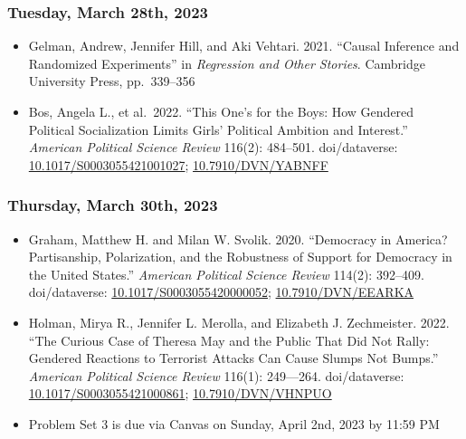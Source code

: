 \documentclass[12pt,]{article}
\begin{document}
\hypertarget{tuesday-march-28th-2023}{%
\subsubsection{Tuesday, March 28th,
2023}\label{tuesday-march-28th-2023}}

\begin{itemize}
\item
  Gelman, Andrew, Jennifer Hill, and Aki Vehtari. 2021. ``Causal
  Inference and Randomized Experiments'' in \emph{Regression and Other
  Stories}. Cambridge University Press, pp.~339--356
\item
  Bos, Angela L., et al.~2022. ``This One's for the Boys: How Gendered
  Political Socialization Limits Girls' Political Ambition and
  Interest.'' \emph{American Political Science Review} 116(2): 484--501.
  doi/dataverse:
  \href{https://doi.org/10.1017/S0003055421001027}{10.1017/S0003055421001027};
  \href{https://dataverse.harvard.edu/dataset.xhtml?persistentId=doi:10.7910/DVN/YABNFF}{10.7910/DVN/YABNFF}
\end{itemize}

\hypertarget{thursday-march-30th-2023}{%
\subsubsection{Thursday, March 30th,
2023}\label{thursday-march-30th-2023}}

\begin{itemize}
\item
  Graham, Matthew H. and Milan W. Svolik. 2020. ``Democracy in America?
  Partisanship, Polarization, and the Robustness of Support for
  Democracy in the United States.'' \emph{American Political Science
  Review} 114(2): 392--409. doi/dataverse:
  \href{https://doi.org/10.1017/S0003055420000052}{10.1017/S0003055420000052};
  \href{https://dataverse.harvard.edu/dataset.xhtml?persistentId=doi:10.7910/DVN/EEARKA}{10.7910/DVN/EEARKA}
\item
  Holman, Mirya R., Jennifer L. Merolla, and Elizabeth J. Zechmeister.
  2022. ``The Curious Case of Theresa May and the Public That Did Not
  Rally: Gendered Reactions to Terrorist Attacks Can Cause Slumps Not
  Bumps.'' \emph{American Political Science Review} 116(1): 249---264.
  doi/dataverse:
  \href{https://doi.org/10.1017/S0003055421000861}{10.1017/S0003055421000861};
  \href{https://dataverse.harvard.edu/dataset.xhtml?persistentId=doi:10.7910/DVN/VHNPUO}{10.7910/DVN/VHNPUO}
\item
  Problem Set 3 is due via Canvas on Sunday, April 2nd, 2023 by 11:59 PM
\end{itemize}
\end{document}
